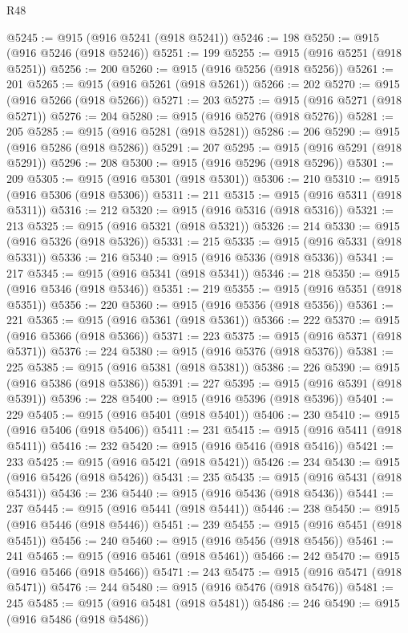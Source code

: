 \begin{lexlean}{R48}
\begin{coremodule}
@5245 := @915 (@916 @5241 (@918 @5241))
@5246 := 198
@5250 := @915 (@916 @5246 (@918 @5246))
@5251 := 199
@5255 := @915 (@916 @5251 (@918 @5251))
@5256 := 200
@5260 := @915 (@916 @5256 (@918 @5256))
@5261 := 201
@5265 := @915 (@916 @5261 (@918 @5261))
@5266 := 202
@5270 := @915 (@916 @5266 (@918 @5266))
@5271 := 203
@5275 := @915 (@916 @5271 (@918 @5271))
@5276 := 204
@5280 := @915 (@916 @5276 (@918 @5276))
@5281 := 205
@5285 := @915 (@916 @5281 (@918 @5281))
@5286 := 206
@5290 := @915 (@916 @5286 (@918 @5286))
@5291 := 207
@5295 := @915 (@916 @5291 (@918 @5291))
@5296 := 208
@5300 := @915 (@916 @5296 (@918 @5296))
@5301 := 209
@5305 := @915 (@916 @5301 (@918 @5301))
@5306 := 210
@5310 := @915 (@916 @5306 (@918 @5306))
@5311 := 211
@5315 := @915 (@916 @5311 (@918 @5311))
@5316 := 212
@5320 := @915 (@916 @5316 (@918 @5316))
@5321 := 213
@5325 := @915 (@916 @5321 (@918 @5321))
@5326 := 214
@5330 := @915 (@916 @5326 (@918 @5326))
@5331 := 215
@5335 := @915 (@916 @5331 (@918 @5331))
@5336 := 216
@5340 := @915 (@916 @5336 (@918 @5336))
@5341 := 217
@5345 := @915 (@916 @5341 (@918 @5341))
@5346 := 218
@5350 := @915 (@916 @5346 (@918 @5346))
@5351 := 219
@5355 := @915 (@916 @5351 (@918 @5351))
@5356 := 220
@5360 := @915 (@916 @5356 (@918 @5356))
@5361 := 221
@5365 := @915 (@916 @5361 (@918 @5361))
@5366 := 222
@5370 := @915 (@916 @5366 (@918 @5366))
@5371 := 223
@5375 := @915 (@916 @5371 (@918 @5371))
@5376 := 224
@5380 := @915 (@916 @5376 (@918 @5376))
@5381 := 225
@5385 := @915 (@916 @5381 (@918 @5381))
@5386 := 226
@5390 := @915 (@916 @5386 (@918 @5386))
@5391 := 227
@5395 := @915 (@916 @5391 (@918 @5391))
@5396 := 228
@5400 := @915 (@916 @5396 (@918 @5396))
@5401 := 229
@5405 := @915 (@916 @5401 (@918 @5401))
@5406 := 230
@5410 := @915 (@916 @5406 (@918 @5406))
@5411 := 231
@5415 := @915 (@916 @5411 (@918 @5411))
@5416 := 232
@5420 := @915 (@916 @5416 (@918 @5416))
@5421 := 233
@5425 := @915 (@916 @5421 (@918 @5421))
@5426 := 234
@5430 := @915 (@916 @5426 (@918 @5426))
@5431 := 235
@5435 := @915 (@916 @5431 (@918 @5431))
@5436 := 236
@5440 := @915 (@916 @5436 (@918 @5436))
@5441 := 237
@5445 := @915 (@916 @5441 (@918 @5441))
@5446 := 238
@5450 := @915 (@916 @5446 (@918 @5446))
@5451 := 239
@5455 := @915 (@916 @5451 (@918 @5451))
@5456 := 240
@5460 := @915 (@916 @5456 (@918 @5456))
@5461 := 241
@5465 := @915 (@916 @5461 (@918 @5461))
@5466 := 242
@5470 := @915 (@916 @5466 (@918 @5466))
@5471 := 243
@5475 := @915 (@916 @5471 (@918 @5471))
@5476 := 244
@5480 := @915 (@916 @5476 (@918 @5476))
@5481 := 245
@5485 := @915 (@916 @5481 (@918 @5481))
@5486 := 246
@5490 := @915 (@916 @5486 (@918 @5486))

\end{coremodule}
\end{lexlean}
